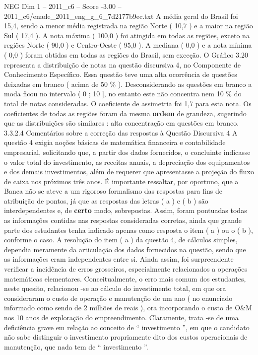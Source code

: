\begin{textsample}{NEG Dim 1 – 2011\_c6 – Score -3.00 – 2011\_c6/enade\_2011\_eng\_g\_6\_7d2177b9ec.txt}
A média geral do Brasil foi 15,4, sendo a menor média registrada na região Norte ( 10,7 ) e a maior na região Sul ( 17,4 ).
A nota máxima ( 100,0 ) foi atingida em todas as regiões, exceto na regiões Norte ( 90,0 ) e Centro-Oeste ( 95,0 ).
A mediana ( 0,0 ) e a nota mínima ( 0,0 ) foram obtidas em todas as regiões do Brasil, sem exceção.
O Gráfico 3.20 representa a distribuição de notas na questão discursiva 4, no Componente de Conhecimento Específico.
Essa questão teve uma alta ocorrência de questões deixadas em branco ( acima de 50 \% ).
Desconsiderando as questões em branco a moda ficou no intervalo ( 0 ; 10 ], no entanto este não concentra nem 10 \% do total de notas consideradas.
O coeficiente de assimetria foi 1,7 para esta nota.
Os coeficientes de todas as regiões foram da mesma \textbf{ordem} de grandeza, sugerindo que as distribuições são similares : alta concentração em questões em branco. 3.3.2.4 Comentários sobre a correção das respostas à Questão Discursiva 4 A questão 4 exigia noções básicas de matemática financeira e contabilidade empresarial, solicitando que, a partir dos dados fornecidos, o concluinte indicasse o valor total do investimento, as receitas anuais, a depreciação dos equipamentos e dos demais investimentos, além de requerer que apresentasse a projeção do fluxo de caixa nos próximos três anos.
É importante ressaltar, por oportuno, que a Banca não se ateve a um rigoroso formalismo das respostas para fins de atribuição de pontos, já que as respostas das letras ( a ) e ( b ) são interdependentes e, de \textbf{certo} modo, sobrepostas.
Assim, foram pontuadas todas as informações contidas nas respostas consideradas corretas, ainda que grande parte dos estudantes tenha indicado apenas como resposta o item ( a ) ou o ( b ), conforme o caso.
A resolução do item ( a ) da questão 4, de cálculos simples, dependia meramente da articulação dos dados fornecidos na questão, sendo que as informações eram independentes entre si.
Ainda assim, foi surpreendente verificar a incidência de erros grosseiros, especialmente relacionados a operações matemáticas elementares.
Conceitualmente, o erro mais comum dos estudantes, neste quesito, relacionou -se ao cálculo do investimento total, em que ora consideraram o custo de operação e manutenção de um ano ( no enunciado informado como sendo de 2 milhões de reais ), ora incorporando o custo de O\&M nos 10 anos de exploração do empreendimento.
Claramente, trata -se de uma deficiência grave em relação ao conceito de “ investimento ”, em que o candidato não sabe distinguir o investimento propriamente dito dos custos operacionais de manutenção, que nada tem de “ investimento ”.

\end{textsample}
